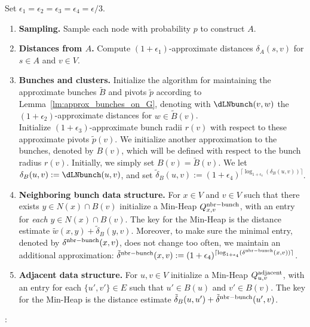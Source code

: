 Set $\epsilon_1=\epsilon_2=\epsilon_3=\epsilon_4=\epsilon/3$.
\begin{enumerate}
    \item \textbf{Sampling.} Sample each node with probability $p$ to construct $A$. \label{step:sampling}
    \item \textbf{Distances from $A$.} Compute $(1+\epsilon_1)$-approximate distances $\delta_A(s,v)$ for $s\in A$ and $v\in V$. 
    \item \textbf{Bunches and clusters.} Initialize the algorithm for maintaining the approximate bunches $\tilde B$ and pivots $\tilde p$ according to Lemma~\ref{lm:approx_bunches_on_G}, denoting with $\dLNbunch(v,w)$ the $(1+\epsilon_2)$-approximate distances for $w\in \tilde B(v)$.\\
    Initialize $(1+\epsilon_3)$-approximate bunch radii $r(v)$ with respect to these approximate pivots $\tilde p(v)$.  \label{step:A_MSSP}
    We initialize another approximation to the bunches, denoted by $B(v)$, which will be defined with respect to the bunch radius $r(v)$. Initially, we simply set $B(v)=\tilde{B}(v)$. We let $\delta_B(u,v):=\dLNbunch(u,v)$, and set $\tilde \delta_B(u,v) := (1+\epsilon_4)^{\lceil \log_{1+\epsilon_4}(\delta_B(u,v))\rceil}$. \label{step:bunches}
    \item \textbf{Neighboring bunch data structure.} For $x\in V$ and $v\in V$ such that there exists $y\in N(x)\cap B(v)$ initialize a Min-Heap $Q^{\rm{nbr-bunch}}_{x,v}$, with an entry for \emph{each} $y\in N(x)\cap B(v)$. The key for the Min-Heap is the distance estimate $ \tilde w (x, y) + \tilde\delta_B (y, v) $. Moreover, to make sure the minimal entry, denoted by $\delta^{\rm{nbr-bunch}}(x,v)$, does not change too often, we maintain an additional approximation: $\tilde \delta^{\rm{nbr-bunch}}(x,v):= (1+\epsilon_4)^{\lceil \log_{1+\epsilon_4}(\delta^{\rm{nbr-bunch}}(x,v))\rceil}$. \label{step:init_nbr_bunch}
    \item \textbf{Adjacent data structure.} For $u,v\in V$ initialize a Min-Heap $Q^{\rm{adjacent}}_{u,v}$, with an entry for each $\{u',v'\}\in E$ such that $u'\in B(u)$ and $v' \in B(v)$. The key for the Min-Heap is the distance estimate $\tilde \delta_B(u,u')+\tilde \delta^{\rm{nbr-bunch}}(u',v)$. \label{step:min_heap_nbr} 
\end{enumerate}

\noindent{}:\\
\indent {}\\

